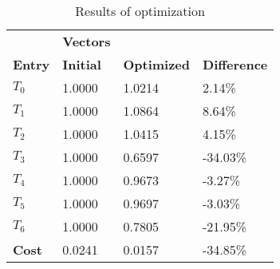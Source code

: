 \begin{table}[h!]
\centering
\begin{tabular}{llll}
\textbf{}      & \cellcolor[HTML]{EFEFEF}\textbf{Vectors} & \textbf{} & \textbf{}         \\
\rowcolor[HTML]{EFEFEF} 
\textbf{Entry} & \textbf{Initial} & \textbf{Optimized} & \textbf{Difference} \\
$T_0$ & 1.0000 & 1.0214 & 2.14\% \\ 
$T_1$ & 1.0000 & 1.0864 & 8.64\% \\ 
$T_2$ & 1.0000 & 1.0415 & 4.15\% \\ 
$T_3$ & 1.0000 & 0.6597 & -34.03\% \\ 
$T_4$ & 1.0000 & 0.9673 & -3.27\% \\ 
$T_5$ & 1.0000 & 0.9697 & -3.03\% \\ 
$T_6$ & 1.0000 & 0.7805 & -21.95\% \\ 
\rowcolor[HTML]{EFEFEF} 
\textbf{Cost}  & 0.0241 & 0.0157 & -34.85\% \\ 
\end{tabular}
\caption{Results of optimization}
\label{tab:OptimizationAnalysis}
\end{table}